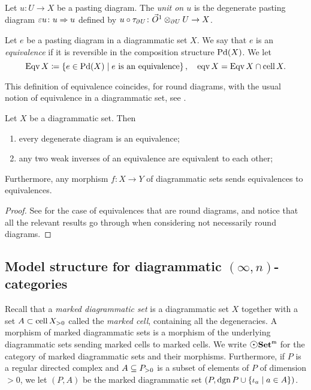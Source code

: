 \begin{dfn} [Unit]
    Let \( u \colon U \to X \) be a pasting diagram.
    The \emph{unit on \( u \)} is the degenerate pasting diagram \( \un u \colon u \celto u \) defined by \( u \after \tau_{\bd{}{} U} \colon \arr \gray_{\bd{}{}U} U \to X \).
\end{dfn}

\begin{dfn} [Equivalence]
    Let \( e \) be a pasting diagram in a diagrammatic set \( X \).
    We say that \( e \) is an \emph{equivalence} if it is reversible in the composition structure \( \Pd(X) \).
    We let
    \begin{equation*}
        \Eqv X \eqdef \set{e \in \Pd(X) \mid e \text{ is an equivalence}},\quad \eqv X = \Eqv X \cap \cell X.
    \end{equation*}
\end{dfn}

\begin{rmk}
    This definition of equivalence coincides, for round diagrams, with the usual notion of equivalence in a diagrammatic set, see \cite[Section 2]{chanavat2024equivalences}.
\end{rmk}

\begin{prop} \label{prop:main_equivalence}
    Let \( X \) be a diagrammatic set.
    Then
    \begin{enumerate}
        \item every degenerate diagram is an equivalence;
        \item any two weak inverses of an equivalence are equivalent to each other;
    \end{enumerate}
    Furthermore, any morphism \( f \colon X \to Y \) of diagrammatic sets sends equivalences to equivalences.
\end{prop}
\begin{proof}
    See \cite[Section]{chanavat2024equivalences} for the case of equivalences that are round diagrams, and notice that all the relevant results go through when considering not necessarily round diagrams.
\end{proof}


\subsection{Model structure for diagrammatic \texorpdfstring{$(\infty, n)$}{(infty, n)}-categories}


Recall that a \emph{marked diagrammatic set} is a diagrammatic set \( X \) together with a set \( A \subset \gr{> 0}{\cell X} \) called the \emph{marked cell}, containing all the degeneracies. 
A morphism of marked diagrammatic sets is a morphism of the underlying diagrammatic sets sending marked cells to marked cells.
We write \( \mdgmSet \) for the category of marked diagrammatic sets and their morphisms. 
Furthermore, if \( P \) is a regular directed complex and \( A \subseteq \gr{> 0}{P} \) is a subset of elements of \( P \) of dimension \( > 0 \), we let \( (P, A) \) be the marked diagrammatic set \( (P, \dgn P \cup \set{\mapel{a} \mid a \in A}) \).

